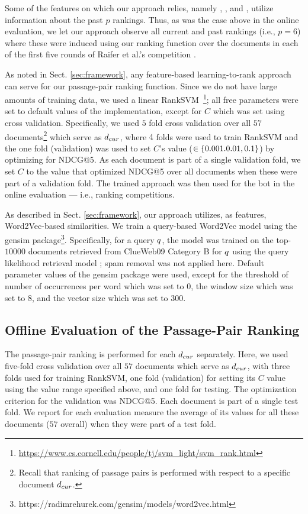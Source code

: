 Some of the features on which our approach relies, namely
{\simSrcPrevTopTF}, {\simTargetPrevTopTF}, {\simSrcPrevTopWtV} and
{\simTargetPrevTopWtV}, utilize information about the past $p$
rankings. Thus, as was the case above in the online evaluation, we let
our approach observe all current and past rankings (i.e., $p=6$) where these were
induced using our ranking function over the documents in each of the
first five rounds of Raifer et al.'s competition \cite{Raifer+al:17a}.

As noted in Sect. \ref{sec:framework}, any feature-based
learning-to-rank approach can serve for our passage-pair ranking
function. Since we do not have large amounts of training data, we used
a linear RankSVM~\cite{Joachims:06a}\footnote{\url{https://www.cs.cornell.edu/people/tj/svm_light/svm_rank.html}};
all free parameters were set to default values of the implementation,
except for $C$ which was set using cross validation. Specifically, we
used $5$ fold cross validation over all $57$ documents\footnote{Recall that ranking of passage pairs is performed with respect to a specific document $d_{cur}$.} which serve as $d_{cur}$, where $4$ folds were used to train RankSVM and the one fold (validation) was used to
set $C$'s value ($\in \{0.001. 0.01, 0.1\}$) by optimizing for
NDCG@5. As each document is part of a single validation fold, we set $C$ to the value that optimized NDCG@5 over all documents when these were part of a validation fold. The trained approach was then used for the bot in the online evaluation --- i.e., ranking competitions.

As described in Sect. \ref{sec:framework}, our approach utilizes, as
features, Word2Vec-based similarities. We train a 
query-based Word2Vec model \cite{Diaz+al:16a} using the {\rm gensim}
package\footnote{https://radimrehurek.com/gensim/models/word2vec.html}. Specifically,
for a query $q$, the model was trained on the top-$10000$ documents
retrieved from ClueWeb09 Category B for $q$ using the query likelihood retrieval model
\cite{Song+Croft:99a}; spam removal was not applied here. Default parameter values of the {\rm gensim}
package were used, except for the threshold of number of occurrences per word which
was set to $0$, the window size which was set to $8$, and the vector size which was set to $300$.  

\subsection{Offline Evaluation of the Passage-Pair Ranking} 
The passage-pair ranking is performed for each $d_{cur}$
separately. Here, we used five-fold cross validation over all $57$
documents which serve as $d_{cur}$, with three folds used for training
RankSVM, one fold (validation) for setting its $C$ value using the value
range specified above, and one fold for testing. The optimization
criterion for the validation was NDCG@5. Each document is part of a
single test fold. We report for each evaluation measure the average of
its values for all these documents ($57$ overall) when they were part
of a test fold. 

